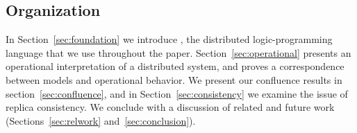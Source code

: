 \subsection{Organization}
In Section~\ref{sec:foundation} we introduce \lang, the distributed logic-programming language that we use throughout the paper.  Section~\ref{sec:operational} presents an operational interpretation of a distributed system, and proves a correspondence between \lang models and operational behavior.  We present our confluence results in section~\ref{sec:confluence}, and in Section~\ref{sec:consistency} we examine the issue of replica consistency.  We conclude with a discussion of related and future work (Sections~\ref{sec:relwork} and~\ref{sec:conclusion}).
